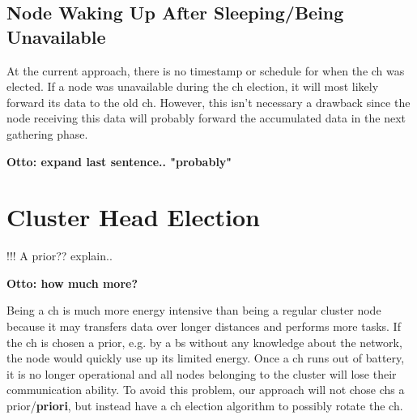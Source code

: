 \documentclass[USenglish]{uit-thesis}
\begin{document}


\subsection{Node Waking Up After Sleeping/Being Unavailable}




At the current approach, there is no timestamp or schedule for when the \gls{ch} was elected. If a node was unavailable during the \gls{ch} election, it will most likely forward its data to the old \gls{ch}. However, this isn't necessary a drawback since the node receiving this data will probably forward the accumulated data in the next gathering phase.

\textbf{Otto: expand last sentence.. "probably"}


\section{Cluster Head Election}
!!! A prior?? explain..

\textbf{Otto: how much more?}

Being a \gls{ch} is much more energy intensive than being a regular cluster node because it may transfers data over longer distances and performs more tasks. If the \gls{ch} is chosen a prior, e.g. by a \gls{bs} without any knowledge about the network, the node would quickly use up its limited energy. Once a \gls{ch} runs out of battery, it is no longer operational and all nodes belonging to the cluster will lose their communication ability. To avoid this problem, our approach will not chose \gls{ch}s a prior/\textbf{priori}, but instead have a \gls{ch} election algorithm to possibly rotate the \gls{ch}.
\end{document}
